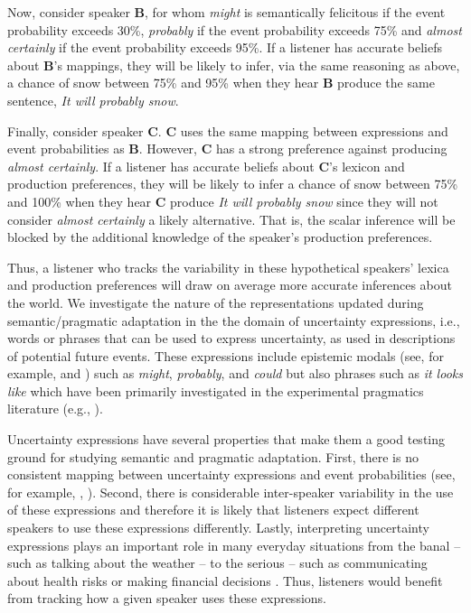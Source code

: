 \documentclass[lucida,biblatex]{sp} %
\begin{document}
Now, consider speaker {\bf B}, for whom \textit{might} is semantically felicitous if the event probability exceeds 30\%, 
\textit{probably} if the event probability exceeds 75\% and \textit{almost certainly}  if the event probability exceeds 95\%. If a listener has
accurate beliefs about {\bf B}'s mappings, they will be likely to infer, via the same reasoning as above, a chance of snow between 75\% and 95\% when they hear {\bf B} produce the same sentence, \textit{It will probably snow}.

Finally, consider speaker {\bf C}. {\bf C} uses the same mapping between expressions and event probabilities as {\bf B}. However, {\bf C} has a strong preference against 
producing \textit{almost certainly}. If a listener has accurate beliefs about {\bf C}'s lexicon and production preferences, 
they will be likely to infer a chance of snow between 75\% and 100\% when they hear {\bf C} produce \textit{It will probably snow} since they will not
consider  \textit{almost certainly} a likely alternative. That is, the scalar inference will be blocked by the additional knowledge of the speaker's production preferences. 

Thus, a listener who tracks the variability in these hypothetical speakers' lexica and production preferences will draw on average more accurate inferences about the world. We investigate the nature of the representations updated during semantic/pragmatic adaptation in the the domain of uncertainty expressions, i.e., words or phrases that can be used to express uncertainty, as used in descriptions of potential future events. These expressions include epistemic modals (see, for example, \citep{Kratzer1991} and \citep{Hacquard2011}) such as \textit{might}, 
\textit{probably}, and \textit{could} but also phrases such as \textit{it looks like} which have been primarily investigated in the experimental pragmatics literature (e.g., \cite{Kurumada2014,Pogue2018}).

Uncertainty expressions have several properties that make them a good testing ground for studying semantic and pragmatic
adaptation. First, there is no consistent mapping between uncertainty expressions and event probabilities
(see, for example, \citet{Clark1990}, \citet{PepperPrytulak1974}). Second, there is considerable inter-speaker variability 
in the use of these expressions \citep{Wallsten1986} and therefore it is likely that listeners expect different speakers to use these expressions
differently. Lastly, interpreting uncertainty expressions plays an important role in many everyday situations from the banal -- such as talking about the weather -- to the serious -- such as communicating about health risks \citep{Berry2004, Lipkus2007, Politi2007} or making financial decisions \citep{Doupnik2003}. 
Thus, listeners would benefit from tracking  how a given speaker uses these expressions. %
\end{document}
